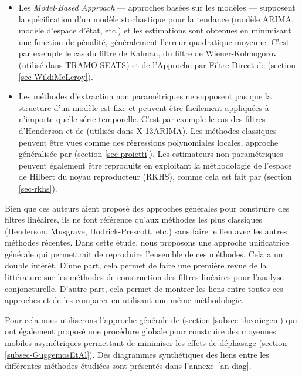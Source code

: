 \documentclass[
  12pt,
  french,
  12pt,a4paper]{article}
\newcommand\1{\mathds{1}}
\begin{document}
\begin{itemize}
\item
  Les \emph{Model-Based Approach} --- approches basées sur les modèles --- supposent la spécification d'un modèle stochastique pour la tendance (modèle ARIMA, modèle d'espace d'état, etc.) et les estimations sont obtenues en minimisant une fonction de pénalité, généralement l'erreur quadratique moyenne.
  C'est par exemple le cas du filtre de Kalman, du filtre de Wiener-Kolmogorov (utilisé dans TRAMO-SEATS) et de l'Approche par Filtre Direct de \textcite{trilemmaWMR2019} (section \ref{sec-WildiMcLeroy}).
\item
  Les méthodes d'extraction non paramétriques ne supposent pas que la structure d'un modèle est fixe et peuvent être facilement appliquées à n'importe quelle série temporelle.
  C'est par exemple le cas des filtres d'Henderson et de \textcite{musgrave1964set} (utilisés dans X-13ARIMA).
  Les méthodes classiques peuvent être vues comme des régressions polynomiales locales, approche généralisée par \textcite{proietti2008} (section \ref{sec-proietti}).
  Les estimateurs non paramétriques peuvent également être reproduits en exploitant la méthodologie de l'espace de Hilbert du noyau reproducteur (RKHS), comme cela est fait par
  \textcite{dagumbianconcini2008} (section \ref{sec-rkhs}).
\end{itemize}

Bien que ces auteurs aient proposé des approches générales pour construire des filtres linéaires, ils ne font référence qu'aux méthodes les plus classiques (Henderson, Musgrave, Hodrick-Prescott, etc.) sans faire le lien avec les autres méthodes récentes.
Dans cette étude, nous proposons une approche unificatrice générale qui permettrait de reproduire l'ensemble de ces méthodes.
Cela a un double intérêt.
D'une part, cela permet de faire une première revue de la littérature sur les méthodes de construction des filtres linéaires pour l'analyse conjoncturelle.
D'autre part, cela permet de montrer les liens entre toutes ces approches et de les comparer en utilisant une même méthodologie.

Pour cela nous utiliserons l'approche générale de \textcite{ch15HBSA} (section \ref{subsec-theoriegen}) qui ont également proposé une procédure globale pour construire des moyennes mobiles asymétriques permettant de minimiser les effets de déphasage (section \ref{subsec-GuggemosEtAl}).
Des diagrammes synthétiques des liens entre les différentes méthodes étudiées sont présentés dans l'annexe~\ref{an-diag}.
\end{document}
